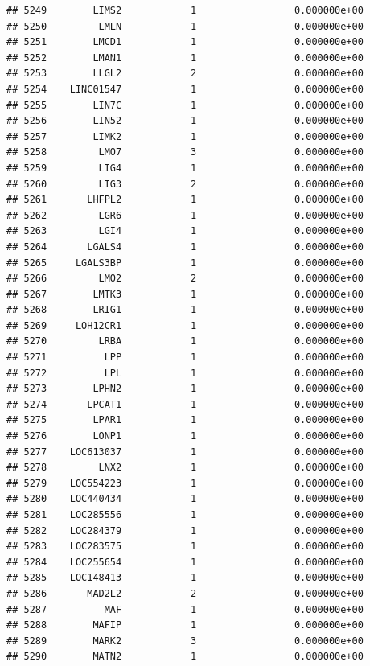 \documentclass[
]{article}
\begin{document}
\begin{verbatim}
## 5249        LIMS2            1                 0.000000e+00
## 5250         LMLN            1                 0.000000e+00
## 5251        LMCD1            1                 0.000000e+00
## 5252        LMAN1            1                 0.000000e+00
## 5253        LLGL2            2                 0.000000e+00
## 5254    LINC01547            1                 0.000000e+00
## 5255        LIN7C            1                 0.000000e+00
## 5256        LIN52            1                 0.000000e+00
## 5257        LIMK2            1                 0.000000e+00
## 5258         LMO7            3                 0.000000e+00
## 5259         LIG4            1                 0.000000e+00
## 5260         LIG3            2                 0.000000e+00
## 5261       LHFPL2            1                 0.000000e+00
## 5262         LGR6            1                 0.000000e+00
## 5263         LGI4            1                 0.000000e+00
## 5264       LGALS4            1                 0.000000e+00
## 5265     LGALS3BP            1                 0.000000e+00
## 5266         LMO2            2                 0.000000e+00
## 5267        LMTK3            1                 0.000000e+00
## 5268        LRIG1            1                 0.000000e+00
## 5269     LOH12CR1            1                 0.000000e+00
## 5270         LRBA            1                 0.000000e+00
## 5271          LPP            1                 0.000000e+00
## 5272          LPL            1                 0.000000e+00
## 5273        LPHN2            1                 0.000000e+00
## 5274       LPCAT1            1                 0.000000e+00
## 5275        LPAR1            1                 0.000000e+00
## 5276        LONP1            1                 0.000000e+00
## 5277    LOC613037            1                 0.000000e+00
## 5278         LNX2            1                 0.000000e+00
## 5279    LOC554223            1                 0.000000e+00
## 5280    LOC440434            1                 0.000000e+00
## 5281    LOC285556            1                 0.000000e+00
## 5282    LOC284379            1                 0.000000e+00
## 5283    LOC283575            1                 0.000000e+00
## 5284    LOC255654            1                 0.000000e+00
## 5285    LOC148413            1                 0.000000e+00
## 5286       MAD2L2            2                 0.000000e+00
## 5287          MAF            1                 0.000000e+00
## 5288        MAFIP            1                 0.000000e+00
## 5289        MARK2            3                 0.000000e+00
## 5290        MATN2            1                 0.000000e+00

\end{verbatim}
\end{document}
